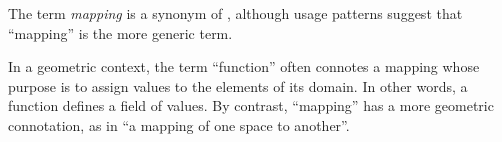 \documentclass[12pt]{article}
\begin{document}
The term \emph{mapping} is a synonym of , although usage patterns suggest that  ``mapping'' is the more generic term.

In a geometric context, the term ``function'' often connotes a mapping whose purpose is to assign values to the elements of its domain. In other words, a function defines a field of values.  By contrast, ``mapping'' has a more geometric connotation, as in ``a mapping of one space to another''.
\end{document}
